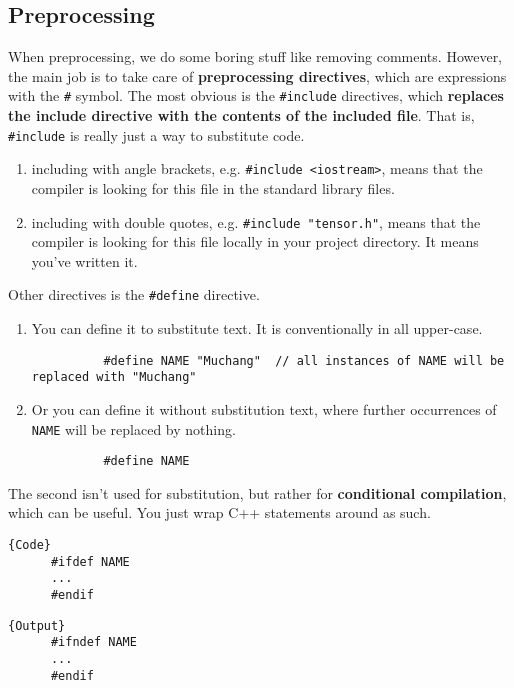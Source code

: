 \documentclass{article}
\begin{document}
  \subsection{Preprocessing} 

    When preprocessing, we do some boring stuff like removing comments. However, the main job is to take care of \textbf{preprocessing directives}, which are expressions with the \texttt{\#} symbol. The most obvious is the \texttt{\#include} directives, which \textbf{replaces the include directive with the contents of the included file}. That is, \texttt{\#include} is really just a way to substitute code.  
    \begin{enumerate}
      \item including with angle brackets, e.g. \texttt{\#include <iostream>}, means that the compiler is looking for this file in the standard library files. 
      \item including with double quotes, e.g. \texttt{\#include "tensor.h"}, means that the compiler is looking for this file locally in your project directory. It means you've written it. 
    \end{enumerate}
    
    Other directives is the \texttt{\#define} directive. 
    \begin{enumerate}
      \item You can define it to substitute text. It is conventionally in all upper-case.  
        \begin{lstlisting}
          #define NAME "Muchang"  // all instances of NAME will be replaced with "Muchang"
        \end{lstlisting}
      \item Or you can define it without substitution text, where further occurrences of \texttt{NAME} will be replaced by nothing. 
        \begin{lstlisting}
          #define NAME 
        \end{lstlisting}
    \end{enumerate}

    The second isn't used for substitution, but rather for \textbf{conditional compilation}, which can be useful. You just wrap C++ statements around as such.

    \noindent\begin{minipage}{.5\textwidth}
    \begin{lstlisting}[]{Code}
      #ifdef NAME 
      ... 
      #endif
    \end{lstlisting}
    \end{minipage}
    \hfill
    \begin{minipage}{.49\textwidth}
    \begin{lstlisting}[]{Output}
      #ifndef NAME 
      ... 
      #endif
      
    \end{lstlisting}
    \end{minipage} 
\end{document}
